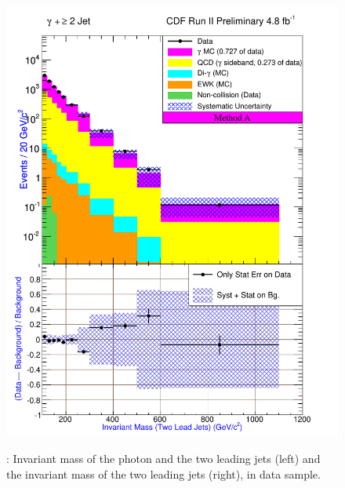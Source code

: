 \documentclass[11pt]{article}
\begin{document}
\begin{figure}[h!]
{ \includegraphics[scale=\resultsHistScale,keepaspectratio=true]{./g30jet_MtdA_plot2_InvMass_j1j2.pdf}
}
 \caption{: Invariant mass of the photon and the two leading jets (left) and the invariant mass of the two leading jets (right), in \photwojet data sample.}
 \label{fig:Result_MtdA_gj2_Mass_gj1j2}
\end{figure}
\end{document}
